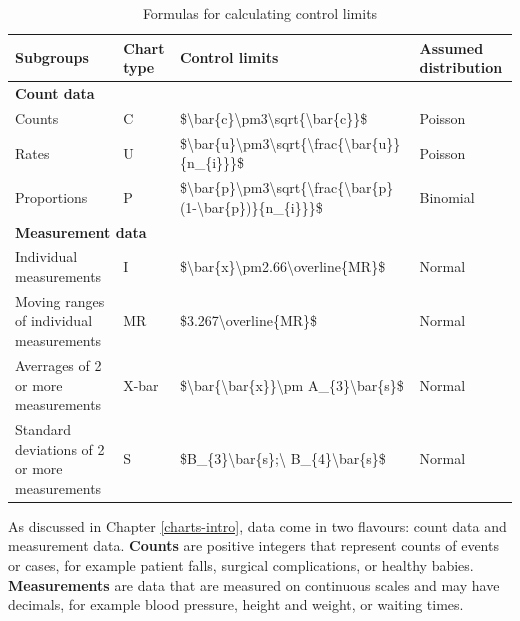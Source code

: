 \documentclass[
]{book}
\begin{document}
\begin{table}

\caption{\label{tab:limits-tab1}Formulas for calculating control limits}
\centering
\begin{tabular}[t]{l|l|l|l}
\hline
Subgroups & Chart type & Control limits & Assumed distribution\\
\hline
\multicolumn{4}{l}{\textbf{Count data}}\\
\hline
\hspace{1em}Counts & C & \$\textbackslash{}bar\{c\}\textbackslash{}pm3\textbackslash{}sqrt\{\textbackslash{}bar\{c\}\}\$ & Poisson\\
\hline
\hspace{1em}Rates & U & \$\textbackslash{}bar\{u\}\textbackslash{}pm3\textbackslash{}sqrt\{\textbackslash{}frac\{\textbackslash{}bar\{u\}\}\{n\_\{i\}\}\}\$ & Poisson\\
\hline
\hspace{1em}Proportions & P & \$\textbackslash{}bar\{p\}\textbackslash{}pm3\textbackslash{}sqrt\{\textbackslash{}frac\{\textbackslash{}bar\{p\}(1-\textbackslash{}bar\{p\})\}\{n\_\{i\}\}\}\$ & Binomial\\
\hline
\multicolumn{4}{l}{\textbf{Measurement data}}\\
\hline
\hspace{1em}Individual measurements & I & \$\textbackslash{}bar\{x\}\textbackslash{}pm2.66\textbackslash{}overline\{MR\}\$ & Normal\\
\hline
\hspace{1em}Moving ranges of individual measurements & MR & \$3.267\textbackslash{}overline\{MR\}\$ & Normal\\
\hline
\hspace{1em}Averrages of 2 or more measurements & X-bar & \$\textbackslash{}bar\{\textbackslash{}bar\{x\}\}\textbackslash{}pm A\_\{3\}\textbackslash{}bar\{s\}\$ & Normal\\
\hline
\hspace{1em}Standard deviations of 2 or more measurements & S & \$B\_\{3\}\textbackslash{}bar\{s\};\textbackslash{} B\_\{4\}\textbackslash{}bar\{s\}\$ & Normal\\
\hline
\end{tabular}
\end{table}

As discussed in Chapter \ref{charts-intro}, data come in two flavours: count data and measurement data. \textbf{Counts} are positive integers that represent counts of events or cases, for example patient falls, surgical complications, or healthy babies. \textbf{Measurements} are data that are measured on continuous scales and may have decimals, for example blood pressure, height and weight, or waiting times.
\end{document}
